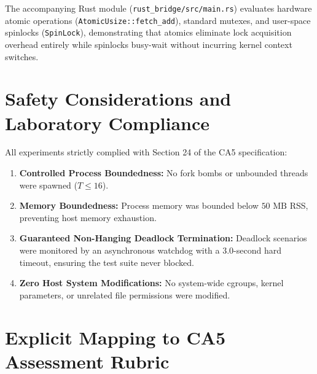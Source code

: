 \documentclass[11pt,a4paper]{article}
\begin{document}
The accompanying Rust module (\texttt{rust\_bridge/src/main.rs}) evaluates hardware atomic operations (\texttt{AtomicUsize::fetch\_add}), standard mutexes, and user-space spinlocks (\texttt{SpinLock}), demonstrating that atomics eliminate lock acquisition overhead entirely while spinlocks busy-wait without incurring kernel context switches.

\section{Safety Considerations and Laboratory Compliance}
All experiments strictly complied with Section 24 of the CA5 specification:
\begin{enumerate}
    \item \textbf{Controlled Process Boundedness:} No fork bombs or unbounded threads were spawned ($T \le 16$).
    \item \textbf{Memory Boundedness:} Process memory was bounded below $50\text{ MB}$ RSS, preventing host memory exhaustion.
    \item \textbf{Guaranteed Non-Hanging Deadlock Termination:} Deadlock scenarios were monitored by an asynchronous watchdog with a 3.0-second hard timeout, ensuring the test suite never blocked.
    \item \textbf{Zero Host System Modifications:} No system-wide cgroups, kernel parameters, or unrelated file permissions were modified.
\end{enumerate}

\section{Explicit Mapping to CA5 Assessment Rubric}
\end{document}
